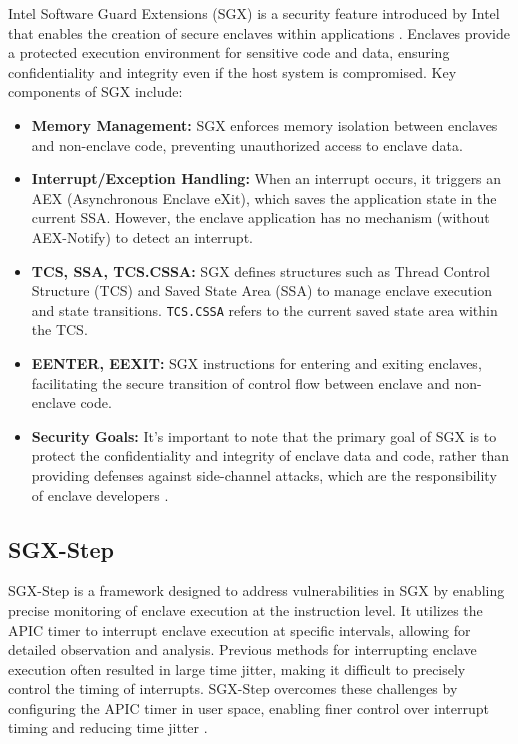 \documentclass{llncs}
\begin{document}
Intel Software Guard Extensions (SGX) is a security feature introduced by Intel
that enables the creation of secure enclaves within applications \cite{CostanD16}.
Enclaves provide a protected execution environment for sensitive code and data,
ensuring confidentiality and integrity even if the host system is compromised.
Key components of SGX include:

\begin{itemize}
  \item \textbf{Memory Management:}
    SGX enforces memory isolation between enclaves and non-enclave code,
    preventing unauthorized access to enclave data.
  \item \textbf{Interrupt/Exception Handling:}
    When an interrupt occurs, it triggers an AEX (Asynchronous Enclave eXit),
    which saves the application state in the current SSA.
    However, the enclave application has no mechanism (without AEX-Notify) to detect an interrupt.
  \item \textbf{TCS, SSA, TCS.CSSA:}
    SGX defines structures such as Thread Control Structure (TCS) and Saved State Area (SSA)
    to manage enclave execution and state transitions.
    \texttt{TCS.CSSA} refers to the current saved state area within the TCS.
  \item \textbf{EENTER, EEXIT:}
    SGX instructions for entering and exiting enclaves,
    facilitating the secure transition of control flow between enclave and non-enclave code.
  \item \textbf{Security Goals:}
    It's important to note that the primary goal of SGX is to protect
    the confidentiality and integrity of enclave data and code,
    rather than providing defenses against side-channel attacks,
    which are the responsibility of enclave developers \cite{CostanD16}.
\end{itemize}

\subsection{SGX-Step}

SGX-Step \cite{BulckPS17} is a framework designed to address vulnerabilities in SGX
by enabling precise monitoring of enclave execution at the instruction level.
It utilizes the APIC timer to interrupt enclave execution at specific intervals,
allowing for detailed observation and analysis.
Previous methods for interrupting enclave execution often resulted in large time jitter,
making it difficult to precisely control the timing of interrupts.
SGX-Step overcomes these challenges by configuring the APIC timer in user space,
enabling finer control over interrupt timing and reducing time jitter \cite{ArnautovTGKMPLM16}.
\end{document}
